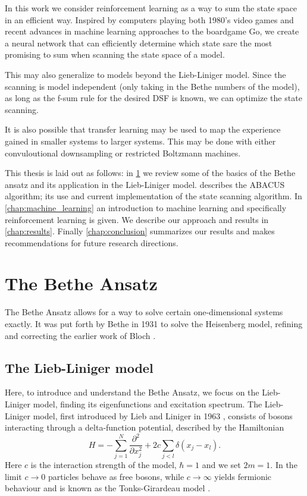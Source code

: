 \documentclass[11pt, a4paper]{report} %
\begin{document}
In this work we consider reinforcement learning as a way to sum the state space in an efficient way.
Inspired by computers playing both 1980's video games \cite{mnih13_playin_atari_with_deep_reinf_learn} and recent advances in machine learning approaches to the boardgame Go\cite{Silver2017a,Silver2017}, we create a neural network that can efficiently determine which state sare the most promising to sum when scanning the state space of a model.

This may also generalize to models beyond the Lieb-Liniger model.
Since the scanning is model independent (only taking in the Bethe numbers of the model), as long as the f-sum rule for the desired DSF is known, we can optimize the state scanning.

It is also possible that transfer learning may be used to map the experience gained in smaller systems to larger systems.
This may be done with either convuloutional downsampling or restricted Boltzmann machines.

This thesis is laid out as follows:
in \cref{chap:bethe_ansatz} we review some of the basics of the Bethe ansatz and its application in the Lieb-Liniger model.
 describes the ABACUS algorithm; its use and current implementation of the state scanning algorithm.
In \cref{chap:machine_learning} an introduction to machine learning and specifically reinforcement learning is given.
We describe our approach and results in \cref{chap:results}.
Finally \cref{chap:conclusion} summarizes our results and makes recommendations for future research directions.




\chapter{The Bethe Ansatz}\label{chap:bethe_ansatz}

The Bethe Ansatz allows for a way to solve certain one-dimensional systems exactly.
It was put forth by Bethe in 1931 to solve the Heisenberg model, refining and correcting the earlier work of Bloch \cite{Bethe1931}.

\section{The Lieb-Liniger model}

Here, to introduce and understand the Bethe Ansatz, we focus on the Lieb-Liniger model, finding its eigenfunctions and excitation spectrum.
The Lieb-Liniger model, first introduced by Lieb and Liniger in 1963 \cite{Lieb1963, Lieb1963a}, consists of bosons interacting through a delta-function potential, described by the Hamiltonian
\begin{equation}
	H = - \sum_{j=1}^{N} \frac{\partial^2}{\partial x_j^2} + 2c \sum_{j<l} \delta(x_j - x_l).
\end{equation}
Here \(c\) is the interaction strength of the model, \(\hbar=1\) and we set \(2m=1\).
In the limit \(c\to0\) particles behave as free bosons, while \(c\to\infty\) yields fermionic behaviour and is known as the Tonks-Girardeau model \cite{Lieb1963, Franchini2017}.
\end{document}
